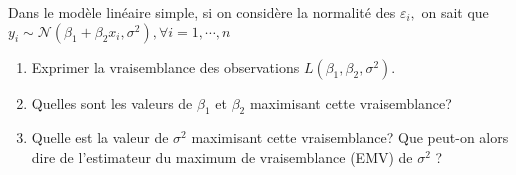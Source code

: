 \documentclass{td_um}
\providecommand{\1}{\mathds{1}}
\begin{document}
\cor{\newpage}


\exo{}
Dans le modèle linéaire simple, si on considère la normalité des $\varepsilon_{i},$ on sait que $y_{i} \sim \mathcal{N}\left(\beta_{1}+\beta_{2} x_{i}, \sigma^{2}\right), \forall i=1, \cdots, n$
\begin{enumerate}
    \item  Exprimer la vraisemblance des observations $L\left(\beta_{1}, \beta_{2}, \sigma^{2}\right)$.
    \item  Quelles sont les valeurs de $\beta_{1}$ et $\beta_{2}$ maximisant cette vraisemblance?
    \item  Quelle est la valeur de $\sigma^{2}$ maximisant cette vraisemblance? Que peut-on alors dire de l'estimateur du maximum de vraisemblance (EMV) de $\sigma^{2}$ ?
\end{enumerate}
\end{document}
